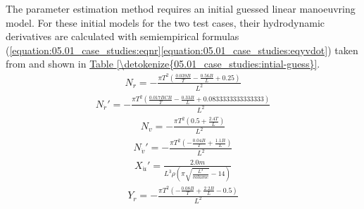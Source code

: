 \documentclass[review]{elsarticle}
\begin{document}
\sphinxAtStartPar
The parameter estimation method requires an initial guessed linear manoeuvring model. For these initial models for the two test cases, their hydrodynamic derivatives are calculated with semi\sphinxhyphen{}empirical formulas (\autoref{equation:05.01_case_studies:eqnr}\sphinxhyphen{}\autoref{equation:05.01_case_studies:eqyvdot}) taken from \cite{brix_manoeuvring_1993} and shown in \hyperref[\detokenize{05.01_case_studies:intial-guess}]{Table \ref{\detokenize{05.01_case_studies:intial-guess}}}.
\begin{equation}\label{equation:05.01_case_studies:eqnr}
\begin{split}\displaystyle N_{r} = - \frac{\pi T^{2} \left(\frac{0.039 B}{T} - \frac{0.56 B}{L} + 0.25\right)}{L^{2}}\end{split}
\end{equation}\begin{equation}\label{equation:05.01_case_studies:eqnrdot}
\begin{split}\displaystyle N_{\dot{r}}' = - \frac{\pi T^{2} \left(\frac{0.017 B CB}{T} - \frac{0.33 B}{L} + 0.0833333333333333\right)}{L^{2}}\end{split}
\end{equation}\begin{equation}\label{equation:05.01_case_studies:eqnv}
\begin{split}\displaystyle N_{v} = - \frac{\pi T^{2} \left(0.5 + \frac{2.4 T}{L}\right)}{L^{2}}\end{split}
\end{equation}\begin{equation}\label{equation:05.01_case_studies:eqnvdot}
\begin{split}\displaystyle N_{\dot{v}}' = - \frac{\pi T^{2} \left(- \frac{0.04 B}{T} + \frac{1.1 B}{L}\right)}{L^{2}}\end{split}
\end{equation}\begin{equation}\label{equation:05.01_case_studies:eqxudot}
\begin{split}\displaystyle X_{\dot{u}}' = \frac{2.0 m}{L^{3} \rho \left(\pi \sqrt{\frac{L^{3}}{volume}} - 14\right)}\end{split}
\end{equation}\begin{equation}\label{equation:05.01_case_studies:eqyr}
\begin{split}\displaystyle Y_{r} = - \frac{\pi T^{2} \left(- \frac{0.08 B}{T} + \frac{2.2 B}{L} - 0.5\right)}{L^{2}}\end{split}

\end{equation}
\end{document}
